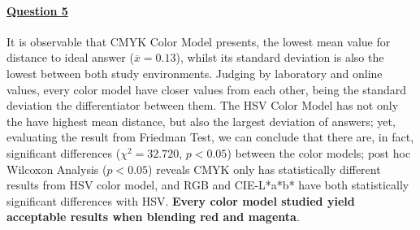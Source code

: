 \paragraph{\ul{Question 5}}
%
It is observable that CMYK Color Model presents, the lowest mean value for distance to ideal answer ($\overline{x} = 0.13$), whilst its standard deviation is also the lowest between both study environments.
Judging by laboratory and online values, every color model have closer values from each other, being the standard deviation the differentiator between them. The HSV Color Model has not only the have highest
mean distance, but also the largest deviation of answers; yet, evaluating the result from Friedman Test, we can conclude that there are, in fact, significant differences ($\chi^2 = 32.720$, $p < 0.05$) between
the color models; post hoc Wilcoxon Analysis ($p < 0.05$) reveals CMYK only has statistically different results from HSV color model, and RGB and CIE-L*a*b* have both statistically significant differences with HSV.
\textbf{Every color model studied yield acceptable results when blending red and magenta}.
%
